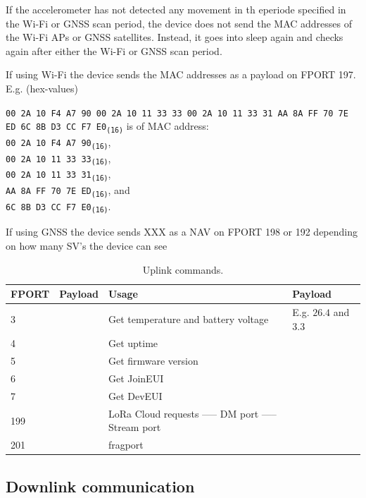 If the accelerometer has not detected any movement in th eperiode specified in the Wi-Fi or GNSS scan period, the device does not send the \ac{MAC} addresses of the Wi-Fi \ac{AP}s or \ac{GNSS} satellites. Instead, it goes into sleep again and checks again after either the Wi-Fi or \ac{GNSS} scan period.



If using Wi-Fi the device sends the \ac{MAC} addresses as a payload on \ac{FPORT} 197. E.g. (hex-values) 

\texttt{00 2A 10 F4 A7 90 00 2A 10 11 33 33 00 2A 10 11 33 31 AA 8A FF 70 7E ED 6C 8B D3 CC F7 E0\textsubscript{(16)}} is of \ac{MAC} address:\\
\texttt{00 2A 10 F4 A7 90\textsubscript{(16)}},\\
\texttt{00 2A 10 11 33 33\textsubscript{(16)}},\\
\texttt{00 2A 10 11 33 31\textsubscript{(16)}},\\
\texttt{AA 8A FF 70 7E ED\textsubscript{(16)}}, and\\
\texttt{6C 8B D3 CC F7 E0\textsubscript{(16)}}.

If using \ac{GNSS} the device sends XXX as a \ac{NAV} on \ac{FPORT} 198 or 192 depending on how many \ac{SV}'s the device can see



\begin{table}[H]
\centering
\caption{Uplink commands.}
\label{tab:uplink_commands}
\begin{tabular}{l|l|p{8cm}|l}
\ac{FPORT} & Payload & Usage & Payload \\ \hline
3 & & Get temperature and battery voltage & E.g. $26.4$ and $3.3$ \\
4 & & Get uptime & \\
5 & & Get firmware version & \\
6 & & Get \ac{JoinEUI} & \\
7 & & Get \ac{DevEUI} & \\
199 & & LoRa Cloud requests ----- DM port ----- Stream port  & \\
201 & & fragport  & \\
\end{tabular}
\end{table}


\subsection{Downlink communication}

